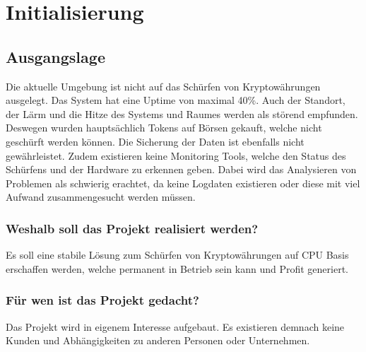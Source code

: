 \section{Initialisierung}
\subsection{Ausgangslage}
Die aktuelle Umgebung ist nicht auf das Schürfen von Kryptowährungen ausgelegt. Das System hat eine Uptime von maximal 40\%. Auch der Standort, der Lärm und die Hitze des Systems und Raumes werden als störend empfunden. Deswegen wurden hauptsächlich Tokens auf Börsen gekauft, welche nicht geschürft werden können. Die Sicherung der Daten ist ebenfalls nicht gewährleistet. Zudem existieren keine Monitoring Tools, welche den Status des Schürfens und der Hardware zu erkennen geben. Dabei wird das Analysieren von Problemen als schwierig erachtet, da keine Logdaten existieren oder diese mit viel Aufwand zusammengesucht werden müssen. 

\subsubsection{Weshalb soll das Projekt realisiert werden?}
Es soll eine stabile Lösung zum Schürfen von Kryptowährungen auf CPU Basis erschaffen werden, welche permanent in Betrieb sein kann und Profit generiert.

\subsubsection{Für wen ist das Projekt gedacht?}
Das Projekt wird in eigenem Interesse aufgebaut. Es existieren demnach keine Kunden und Abhängigkeiten zu anderen Personen oder Unternehmen.

